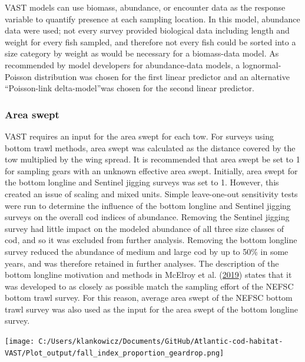 \documentclass[
]{article}
\let\origfigure\figure
\let\endorigfigure\endfigure
\renewenvironment{figure}[1][2] {
    \expandafter\origfigure\expandafter[H]
} {
    \endorigfigure
}
\begin{document}
VAST models can use biomass, abundance, or encounter data as the response variable to quantify presence at each sampling location. In this model, abundance data were used; not every survey provided biological data including length and weight for every fish sampled, and therefore not every fish could be sorted into a size category by weight as would be necessary for a biomass-data model. As recommended by model developers for abundance-data models, a lognormal-Poisson distribution was chosen for the first linear predictor and an alternative ``Poisson-link delta-model''was chosen for the second linear predictor.

\hypertarget{area-swept}{%
\subsubsection{Area swept}\label{area-swept}}

VAST requires an input for the area swept for each tow. For surveys using bottom trawl methods, area swept was calculated as the distance covered by the tow multiplied by the wing spread. It is recommended that area swept be set to 1 for sampling gears with an unknown effective area swept. Initially, area swept for the bottom longline and Sentinel jigging surveys was set to 1. However, this created an issue of scaling and mixed units. Simple leave-one-out sensitivity tests were run to determine the influence of the bottom longline and Sentinel jigging surveys on the overall cod indices of abundance. Removing the Sentinel jigging survey had little impact on the modeled abundance of all three size classes of cod, and so it was excluded from further analysis. Removing the bottom longline survey reduced the abundance of medium and large cod by up to 50\% in some years, and was therefore retained in further analyses. The description of the bottom longline motivation and methods in McElroy et al. (\protect\hyperlink{ref-mcelroy_2019}{2019}) states that it was developed to as closely as possible match the sampling effort of the NEFSC bottom trawl survey. For this reason, average area swept of the NEFSC bottom trawl survey was also used as the input for the area swept of the bottom longline survey.

\begin{figure}
\centering
\texttt{[image: C:/Users/klankowicz/Documents/GitHub/Atlantic-cod-habitat-VAST/Plot\_output/fall\_index\_proportion\_geardrop.png]}
\caption{Figure 3: Proportional comparison of fall cod abundance by age group, using model runs with all available data as the control.}
\end{figure}
\end{document}
